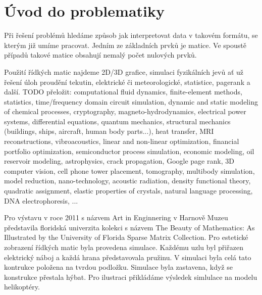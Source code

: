 \chapter{Úvod do problematiky}

Při řešení problémů hledáme způsob jak interpretovat data v takovém formátu, se kterým již umíme pracovat. Jedním ze základních prvků je matice. Ve spoustě případů takové matice obsahují nemalý počet nulových prvků.

Použití řídkých matic najdeme 2D/3D grafice, simulaci fyzikálních jevů ať už řešení úloh proudění tekutin, elektrické či meteorologické, statistice, pagerank a další.
TODO přeložit: computational fluid dynamics, finite-element methods, statistics, time/frequency 
domain circuit simulation, dynamic and static modeling of chemical processes, 
cryptography, magneto-hydrodynamics, electrical power systems, differential
equations, quantum mechanics, structural mechanics (buildings, ships, aircraft,
human body parts...), heat transfer, MRI reconstructions, vibroacoustics, linear 
and non-linear optimization, financial portfolio optimization, semiconductor 
process simulation, economic modeling, oil reservoir modeling, astrophysics, 
crack propagation,  Google page rank, 3D computer vision, cell phone tower 
placement, tomography, multibody simulation, model reduction, nano-technology, 
acoustic radiation, density functional theory, quadratic assignment, elastic 
properties of crystals, natural language processing, DNA electrophoresis, ... 


Pro výstavu v roce 2011 s názvem Art in Enginnering v Harnově Muzeu představila floridská univerzita kolekci s názvem The Beauty of Mathematics: As Illustrated by the University of Florida Sparse Matrix Collection. Pro estetické zobrazení řídkých matic byla provedena simulace. Každému uzlu byl přiřazen elektrický náboj a každá hrana představovala pružinu. V simulaci byla celá tato kontrukce položena na tvrdou podložku. Simulace byla zastavena, když se konstrukce přestala hýbat. Pro ilustraci přikládáme výsledek simlulace na modelu helikoptéry.

